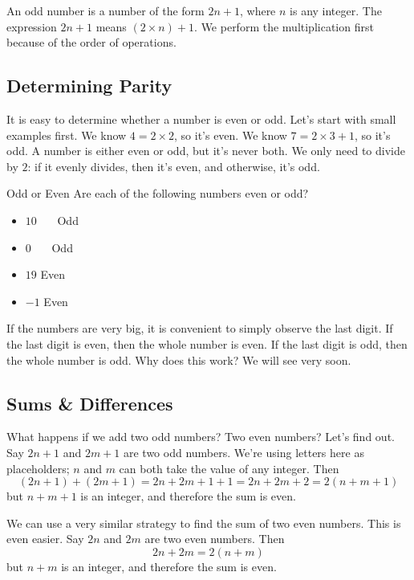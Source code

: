 \documentclass[a4paper,10pt]{report}
\begin{document}
An odd number is a number of the form $2n+1$, where $n$ is any integer. The
expression $2n+1$ means $(2\times n) + 1$. We perform the multiplication first
because of the order of operations.

\subsection{Determining Parity}
It is easy to determine whether a number is even or odd. Let's start with small
examples first. We know $4=2\times2$, so it's even. We know $7=2\times3+1$, so
it's odd. A number is either even or odd, but it's never both. We only need to
divide by $2$: if it evenly divides, then it's even, and otherwise, it's odd.

\begin{problem}{Odd or Even}
 Are each of the following numbers even or odd?

 \begin{itemize}
  \item $10$ \hfill {}~~~Odd
  \item $0$ \hfill {}~~~Odd
  \item $19$ \hfill Even~~~
  \item $-1$ \hfill Even~~~
 \end{itemize}
\end{problem}

If the numbers are very big, it is convenient to simply observe the last digit.
If the last digit is even, then the whole number is even. If the last digit is
odd, then the whole number is odd. Why does this work? We will see very soon.

\subsection{Sums \& Differences}

What happens if we add two odd numbers? Two even numbers? Let's find out. Say
$2n+1$ and $2m+1$ are two odd numbers. We're using letters here as placeholders;
$n$ and $m$ can both take the value of any integer. Then \[
 (2n+1) + (2m+1) = 2n + 2m + 1 + 1 = 2n + 2m + 2 = 2(n+m+1)
\] but $n+m+1$ is an integer, and therefore the sum is even.

We can use a very similar strategy to find the sum of two even numbers. This is
even easier. Say $2n$ and $2m$ are two even numbers. Then \[
 2n + 2m = 2(n+m)
\] but $n+m$ is an integer, and therefore the sum is even.
\end{document}
